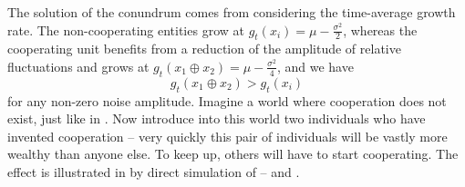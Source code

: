 The solution of the conundrum comes from considering the time-average
growth rate. The non-cooperating entities grow at $g_{t}(x_i)=\mu-\frac{\sigma^2}{2}$, 
whereas the cooperating unit benefits from a reduction of the amplitude of relative 
fluctuations and grows at $g_{t}(x_1\oplus x_2)=\mu-\frac{\sigma^2}{4}$, 
and we have
\begin{equation}
g_{t}(x_1\oplus x_2)>g_{t}(x_i)
\end{equation}
for any non-zero noise amplitude. Imagine a world where cooperation does not exist, 
just like in . Now introduce into this world two individuals who have 
invented cooperation -- very quickly this pair of individuals will be vastly more wealthy than
anyone else. To keep up, others will have to start cooperating. The effect is illustrated 
in  by direct simulation of
-- and .

